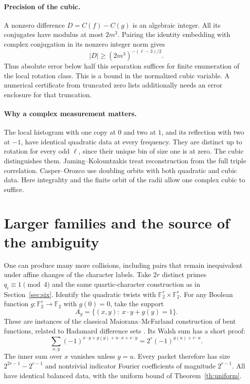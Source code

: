 \documentclass[11pt,letterpaper]{article}
\newcommand{\F}{\mathbb F}
\begin{document}
\paragraph{Precision of the cubic.}
A nonzero difference $D=C(f)-C(g)$ is an algebraic integer. All its conjugates have modulus at most $2m^3$. Pairing the identity embedding with complex conjugation in its nonzero integer norm gives
\[
 |D|\ge (2m^3)^{-(\ell-3)/2}.
\]
Thus absolute error below half this separation suffices for finite enumeration of the local rotation class. This is a bound in the normalized cubic variable. A numerical certificate from truncated zero lists additionally needs an error enclosure for that truncation.

\paragraph{Why a complex measurement matters.}
The local histogram with one copy at $0$ and two at $1$, and its reflection with two at $-1$, have identical quadratic data at every frequency. They are distinct up to rotation for every odd $\ell$, since their unique bin of size one is at zero. The cubic distinguishes them. Jaming--Kolountzakis \cite{JK} treat reconstruction from the full triple correlation. Casper--Orozco \cite[Theorem 3.1]{CO} use doubling orbits with both quadratic and cubic data. Here integrality and the finite orbit of the radii allow one complex cubic to suffice.

\newpage
\section{Larger families and the source of the ambiguity}
One can produce many more collisions, including pairs that remain inequivalent under affine changes of the character labels. Take $2r$ distinct primes $q_i\equiv1\pmod4$ and the same quartic-character construction as in Section~\ref{sec:six}. Identify the quadratic twists with $\F_2^r\times\F_2^r$. For any Boolean function $g:\F_2^r\to\F_2$ with $g(0)=0$, take the support
\[
 A_g=\{(x,y):\ x\cdot y+g(y)=1\}.
\]
These are instances of the classical Maiorana--McFarland construction of bent functions, related to Hadamard difference sets \cite{Dillon,Carlet}. Its Walsh sum has a short proof:
\[
 \sum_{x,y}(-1)^{x\cdot y+g(y)+u\cdot x+v\cdot y}
   =2^r(-1)^{g(u)+v\cdot u}.
\]
The inner sum over $x$ vanishes unless $y=u$. Every packet therefore has size $2^{2r-1}-2^{r-1}$ and nontrivial indicator Fourier coefficients of magnitude $2^{r-1}$. All have identical balanced data, with the uniform bound of Theorem~\ref{th:uniform}.
\end{document}
